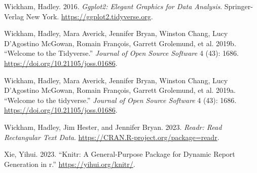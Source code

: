 \documentclass[
  letterpaper,
  DIV=11,
  numbers=noendperiod]{scrartcl}
\newlength{\cslhangindent}
\newenvironment{CSLReferences}[2] %
 {\begin{list}{}{%
  \setlength{\itemindent}{0pt}
  \setlength{\leftmargin}{0pt}
  \setlength{\parsep}{0pt}
  \ifodd #1
   \setlength{\leftmargin}{\cslhangindent}
   \setlength{\itemindent}{-1\cslhangindent}
  \fi
  \setlength{\itemsep}{#2\baselineskip}}}
 {\end{list}}
\begin{document}
\begin{CSLReferences}{1}{0}
Wickham, Hadley. 2016. \emph{Ggplot2: Elegant Graphics for Data
Analysis}. Springer-Verlag New York.
\url{https://ggplot2.tidyverse.org}.

Wickham, Hadley, Mara Averick, Jennifer Bryan, Winston Chang, Lucy
D'Agostino McGowan, Romain François, Garrett Grolemund, et al. 2019b.
{``Welcome to the Tidyverse.''} \emph{Journal of Open Source Software} 4
(43): 1686. \url{https://doi.org/10.21105/joss.01686}.

Wickham, Hadley, Mara Averick, Jennifer Bryan, Winston Chang, Lucy
D'Agostino McGowan, Romain François, Garrett Grolemund, et al. 2019a.
{``Welcome to the {tidyverse}.''} \emph{Journal of Open Source Software}
4 (43): 1686. \url{https://doi.org/10.21105/joss.01686}.

Wickham, Hadley, Jim Hester, and Jennifer Bryan. 2023. \emph{Readr: Read
Rectangular Text Data}. \url{https://CRAN.R-project.org/package=readr}.

Xie, Yihui. 2023. {``Knitr: A General-Purpose Package for Dynamic Report
Generation in r.''} \url{https://yihui.org/knitr/}.

\end{CSLReferences}
\end{document}
